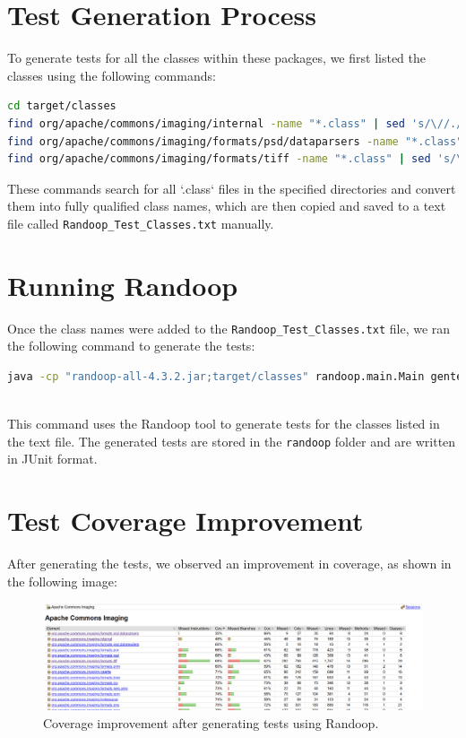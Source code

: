 \documentclass[a4paper,12pt]{report}
\begin{document}
\section{Test Generation Process}
To generate tests for all the classes within these packages, we first listed the classes using the following commands:

\begin{lstlisting}[language=bash]
cd target/classes
find org/apache/commons/imaging/internal -name "*.class" | sed 's/\//./g' | sed 's/\.class$//'
find org/apache/commons/imaging/formats/psd/dataparsers -name "*.class" | sed 's/\//./g' | sed 's/\.class$//'
find org/apache/commons/imaging/formats/tiff -name "*.class" | sed 's/\//./g' | sed 's/\.class$//'
\end{lstlisting}

These commands search for all `.class` files in the specified directories and convert them into fully qualified class names, which are then copied and saved to a text file called \texttt{Randoop\_Test\_Classes.txt} manually.

\section{Running Randoop}
Once the class names were added to the \texttt{Randoop\_Test\_Classes.txt} file, we ran the following command to generate the tests:

\begin{lstlisting}[language=bash]
java -cp "randoop-all-4.3.2.jar;target/classes" randoop.main.Main gentests $(Get-Content Randoop_Test_Classes.txt | ForEach-Object \{ "--testclass=$\_"\} ) --time-limit=200 --junit-output-dir=src/test/java/org/apache/commons/imaging/randoop/
\end{lstlisting}
\\
This command uses the Randoop tool to generate tests for the classes listed in the text file. The generated tests are stored in the \texttt{randoop} folder and are written in JUnit format.

\section{Test Coverage Improvement}
After generating the tests, we observed an improvement in coverage, as shown in the following image:
\begin{figure}[H]
    \centering
    \includegraphics[width=\textwidth]{Report_Img/auto_gen_final.png}
    \caption{Coverage improvement after generating tests using Randoop.}
    \label{fig:coverage-improvement}
\end{figure}
\end{document}
